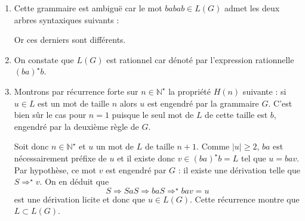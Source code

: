 \documentclass[a4paper, 11pt]{article}
\begin{document}
\begin{enumerate}
  \item Cette grammaire est ambiguë car le mot $babab \in L(G)$ admet les deux arbres syntaxiques suivants : \begin{center}
      \begin{minipage}{6cm}
      \end{minipage}
      \qquad
      \begin{minipage}{6cm}
  \end{minipage}
  \end{center}
  Or ces derniers sont différents.
  \item On constate que $L(G)$ est rationnel car dénoté par l'expression rationnelle $(ba)^{\star}b$.
  
 
  \item Montrons par récurrence forte sur $n \in \mathbb{N}^{\star}$ la propriété $H(n)$ suivante : si $u \in L$ est un mot de taille $n$ alors $u$ est engendré par la grammaire $G$. C'est bien sûr le cas pour $n = 1$ puisque le seul mot de $L$ de cette taille est $b$, engendré par la deuxième règle de $G$. 
  
  Soit donc $n \in \mathbb{N}^{\star}$ et $u$ un mot de $L$ de taille $n+1$. Comme $|u| \geq 2$, $ba$ est nécessairement préfixe de $u$ et il existe donc $v \in (ba)^{\star}b = L$ tel que $u = bav$. Par hypothèse, ce mot $v$ est engendré par $G$ : il existe une dérivation telle que $S \Rightarrow^{\star} v$. On en déduit que \[S \Rightarrow SaS \Rightarrow baS \Rightarrow^{\star} bav = u \] est une dérivation licite et donc que $u \in L(G)$. Cette récurrence montre que $L \subset L(G)$.


\end{enumerate}
\end{document}
